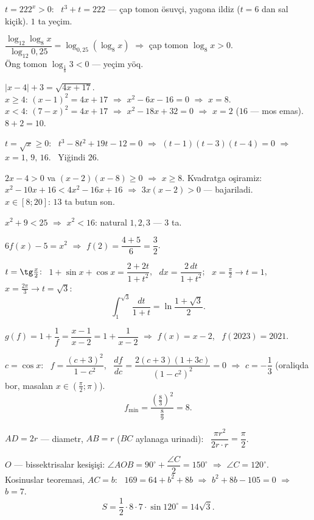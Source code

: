 $t=222^x>0$: \ $t^3+t=222$ — çap tomon ösuvçi, yagona ildiz ($t=6$ dan sal kiçik). $1$ ta yeçim.

$\dfrac{\log_{12}\log_8x}{\log_{12}0{,}25}=\log_{0{,}25}\left(\log_8x\right)$ $\Rightarrow$ çap tomon $\log_8x>0$.\\
Öng tomon $\log_{\frac18}3<0$ — yeçim yöq.

$|x-4|+3=\sqrt{4x+17}$.\\
$x\ge4$: $(x-1)^2=4x+17$ $\Rightarrow$ $x^2-6x-16=0$ $\Rightarrow$ $x=8$.\\
$x<4$: $(7-x)^2=4x+17$ $\Rightarrow$ $x^2-18x+32=0$ $\Rightarrow$ $x=2$ ($16$ — mos emas). \ $8+2=10$.

$t=\sqrt x\ge0$: \ $t^3-8t^2+19t-12=0$ $\Rightarrow$ $(t-1)(t-3)(t-4)=0$ $\Rightarrow$ $x=1,\,9,\,16$. \ Yiğindi $26$.

$2x-4>0$ va $(x-2)(x-8)\ge0$ $\Rightarrow$ $x\ge8$. Kvadratga oşiramiz: $x^2-10x+16<4x^2-16x+16$ $\Rightarrow$ $3x(x-2)>0$ — bajariladi.\\
$x\in[8;20]$: $13$ ta butun son.

$x^2+9<25$ $\Rightarrow$ $x^2<16$: natural $1,2,3$ — $3$ ta.

$6f(x)-5=x^2$ $\Rightarrow$ $f(2)=\dfrac{4+5}6=\dfrac32$.

$t=\tg\frac x2$: \ $1+\sin x+\cos x=\dfrac{2+2t}{1+t^2}$, \ $dx=\dfrac{2\,dt}{1+t^2}$; \ $x=\frac\pi2\to t=1$, \ $x=\frac{2\pi}3\to t=\sqrt3$:
\[\int_1^{\sqrt3}\frac{dt}{1+t}=\ln\frac{1+\sqrt3}2.\]

$g(f)=1+\dfrac1f=\dfrac{x-1}{x-2}=1+\dfrac1{x-2}$ $\Rightarrow$ $f(x)=x-2$, \ $f(2023)=2021$.

$c=\cos x$: \ $f=\dfrac{(c+3)^2}{1-c^2}$, \ $\dfrac{d f}{dc}=\dfrac{2(c+3)(1+3c)}{\left(1-c^2\right)^2}=0$ $\Rightarrow$ $c=-\dfrac13$ (oraliqda bor, masalan $x\in\left(\frac\pi2;\pi\right)$).
\[f_{\min}=\frac{\left(\frac83\right)^2}{\frac89}=8.\]

$AD=2r$ — diametr, $AB=r$ ($BC$ aylanaga urinadi): \ $\dfrac{\pi r^2}{2r\cdot r}=\dfrac\pi2$.

$O$ — bissektrisalar kesişişi: $\angle AOB=90^\circ+\dfrac{\angle C}2=150^\circ$ $\Rightarrow$ $\angle C=120^\circ$.\\
Kosinuslar teoremasi, $AC=b$: \ $169=64+b^2+8b$ $\Rightarrow$ $b^2+8b-105=0$ $\Rightarrow$ $b=7$.
\[S=\frac12\cdot8\cdot7\cdot\sin120^\circ=14\sqrt3.\]

